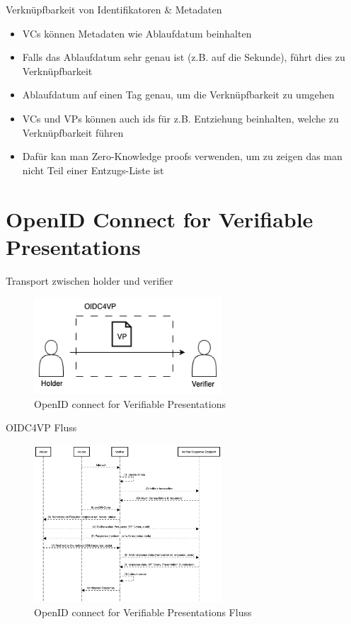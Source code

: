 \documentclass[
	german,%
	authorontitle=true,
	]{bfhbeamer}
\begin{document}
\begin{frame}{Verknüpfbarkeit von Identifikatoren \& Metadaten}
    \begin{itemize}
        \item VCs können Metadaten wie Ablaufdatum beinhalten
        \item Falls das Ablaufdatum sehr genau ist (z.B. auf die Sekunde), führt dies zu Verknüpfbarkeit
        \item Ablaufdatum auf einen Tag genau, um die Verknüpfbarkeit zu umgehen
        \item VCs und VPs können auch ids für z.B. Entziehung beinhalten, welche zu Verknüpfbarkeit führen
        \item Dafür kan man Zero-Knowledge proofs verwenden, um zu zeigen das man nicht Teil einer Entzugs-Liste ist
    \end{itemize}
\end{frame}

\section{OpenID Connect for Verifiable Presentations}

\begin{frame}{Transport zwischen holder und verifier}
    \begin{figure}
        \centering
        \includegraphics[width=70mm]{../img/OIDC4VP.png}
        \caption{OpenID connect for Verifiable Presentations}
    \end{figure}
\end{frame}

\begin{frame}{OIDC4VP Fluss}
    \begin{figure}
        \centering
        \includegraphics[width=70mm]{../img/OIDC4VPFlow.png}
        \caption{OpenID connect for Verifiable Presentations Fluss}
    \end{figure}
\end{frame}
\end{document}
